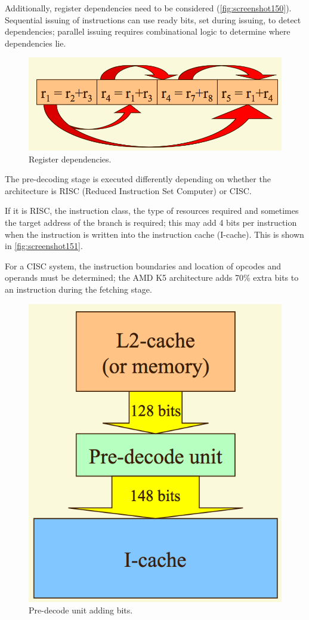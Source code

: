 Additionally, register dependencies need to be considered (\autoref{fig:screenshot150}). Sequential issuing of instructions can use ready bits, set during issuing, to detect dependencies; parallel issuing requires combinational logic to determine where dependencies lie.

\begin{figure}
\centering
\includegraphics[width=0.7\linewidth]{screenshot150}
\caption{Register dependencies.}
\label{fig:screenshot150}
\end{figure}

The pre-decoding stage is executed differently depending on whether the architecture is RISC (Reduced Instruction Set Computer) or CISC. 

If it is RISC, the instruction class, the type of resources required and sometimes the target address of the branch is required; this may add 4 bits per instruction when the instruction is written into the instruction cache (I-cache). This is shown in \autoref{fig:screenshot151}.

For a CISC system, the instruction boundaries and location of opcodes and operands must be determined; the AMD K5 architecture adds 70\% extra bits to an instruction during the fetching stage.

\begin{figure}
\centering
\includegraphics[width=0.7\linewidth]{screenshot151}
\caption{Pre-decode unit adding bits.}
\label{fig:screenshot151}
\end{figure}

